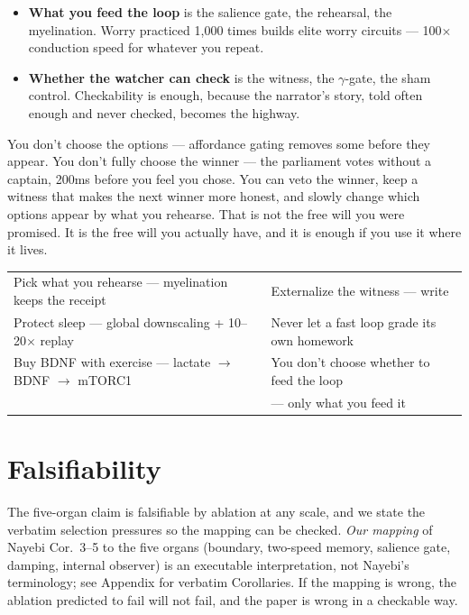 \documentclass[11pt]{article}
\begin{document}
{\begin{itemize}
\item \textbf{What you feed the loop} is the salience gate, the rehearsal, the myelination. Worry practiced 1,000 times builds elite worry circuits --- 100$\times$ conduction speed for whatever you repeat.
\item \textbf{Whether the watcher can check} is the witness, the $\gamma$-gate, the sham control. Checkability is enough, because the narrator's story, told often enough and never checked, becomes the highway.
\end{itemize}

You don't choose the options --- affordance gating removes some before they appear. You don't fully choose the winner --- the parliament votes without a captain, 200ms before you feel you chose. You can veto the winner, keep a witness that makes the next winner more honest, and slowly change which options appear by what you rehearse. That is not the free will you were promised. It is the free will you actually have, and it is enough if you use it where it lives.

\begin{center}
\begin{tabular}{p{5.7cm}p{5.7cm}}
\toprule
Pick what you rehearse --- myelination keeps the receipt & Externalize the witness --- write \\
Protect sleep --- global downscaling + 10--20$\times$ replay & Never let a fast loop grade its own homework \\
Buy BDNF with exercise --- lactate $\to$\allowbreak{} BDNF $\to$\allowbreak{} mTORC1 & You don't choose whether to feed the loop \\
& --- only what you feed it \\
\bottomrule
\end{tabular}
\end{center}

\section{Falsifiability}
\label{sec:falsifiability}

The five-organ claim is falsifiable by ablation at any scale, and we state the verbatim selection pressures so the mapping can be checked. \emph{Our mapping} of Nayebi Cor.~3--5 to the five organs (boundary, two-speed memory, salience gate, damping, internal observer) is an executable interpretation, not Nayebi's terminology; see Appendix for verbatim Corollaries. If the mapping is wrong, the ablation predicted to fail will not fail, and the paper is wrong in a checkable way.

}
\end{document}
